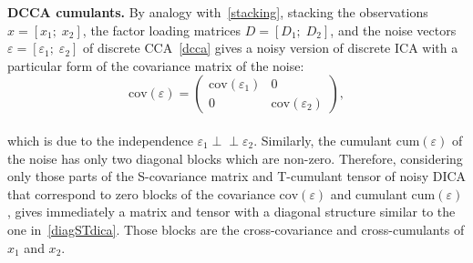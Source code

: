 \documentclass{article}
\newcommand{\ppp}{\textbf}
\newcommand{\zero}{0}
\newcommand{\cov}{\mathrm{cov}}
\newcommand{\cum}{\mathrm{cum}}
\newcommand{\ci}{\perp\!\!\!\perp}
\begin{document}
\ppp{DCCA cumulants.}
By analogy with~\eqref{stacking}, stacking the observations $x=[x_1; \; x_2]$, the factor loading matrices $D=[D_1; \; D_2]$, and the noise vectors $\varepsilon=[\varepsilon_1; \; \varepsilon_2]$ of discrete CCA~\eqref{dcca} gives a noisy version of discrete ICA with a particular form of the covariance matrix of the noise:
\\[-0.5em]
\begin{equation}\label{cov-noise-stacked-cca}
\textstyle
\cov(\varepsilon) = \begin{pmatrix} \cov(\varepsilon_1) & \zero \\ \zero & \cov(\varepsilon_2) \end{pmatrix},
\end{equation}
\\[-0.5em]
which is due to the independence $\varepsilon_1 \ci \varepsilon_2$.
Similarly, the cumulant $\cum(\varepsilon)$ of the noise has only two diagonal blocks which are non-zero. Therefore, considering only those parts of the S-covariance matrix and T-cumulant tensor of noisy DICA that correspond to zero blocks of the covariance $\cov(\varepsilon)$ and cumulant $\cum(\varepsilon)$, gives immediately a matrix and tensor with a diagonal structure similar to the one in~\eqref{diagSTdica}. Those blocks are the cross-covariance and cross-cumulants of $x_1$ and $x_2$.
\end{document}
